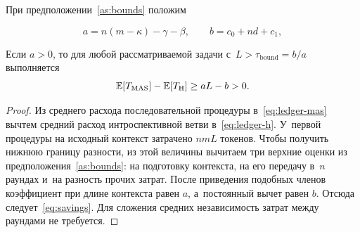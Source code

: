 \begin{proposition}\label{prop:savings}
При предположении~\ref{as:bounds} положим
\begin{formulakey}
\begin{equation}
a=n(m-\kappa)-\gamma-\beta,\qquad b=c_0+nd+c_1,
\end{equation}
\begin{symbols}
\end{symbols}
\end{formulakey}
\begin{formulakey}
Если $a>0$, то для любой рассматриваемой задачи с~$L>\tau_{\mathrm{bound}}=b/a$ выполняется
\nopagebreak
\begin{equation}
\mathbb{E}[T_{\mathrm{MAS}}]-\mathbb{E}[T_{\mathrm{H}}]\ge aL-b>0.
\label{eq:savings}
\end{equation}
\begin{symbols}
\end{symbols}
\end{formulakey}
\end{proposition}
\begin{proof}
Из среднего расхода последовательной процедуры в~\eqref{eq:ledger-mas} вычтем средний расход интроспективной ветви в~\eqref{eq:ledger-h}. У~первой процедуры на исходный контекст затрачено $nmL$ токенов. Чтобы получить нижнюю границу разности, из этой величины вычитаем три верхние оценки из предположения~\ref{as:bounds}: на подготовку контекста, на его передачу в~$n$ раундах и~на разность прочих затрат. После приведения подобных членов коэффициент при длине контекста равен $a$, а~постоянный вычет равен $b$. Отсюда следует~\eqref{eq:savings}. Для сложения средних независимость затрат между раундами не требуется.
\end{proof}

